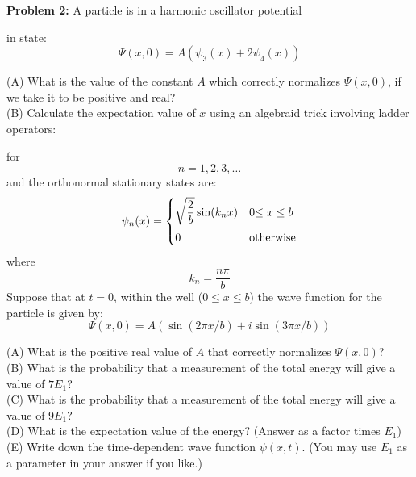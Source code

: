 \documentclass[12pt]{article}
\begin{document}
\noindent
{\bf Problem 2:}
A particle is in a harmonic oscillator potential




in state:
$$\Psi(x,0) = A\left( \psi_3(x) + 2\psi_4(x) \right)$$

(A) What is the value of the constant $A$ which correctly normalizes $\Psi(x,0)$, if we take it to be positive and real?\\[5pt]

(B) Calculate the expectation value of $x$ using an algebraid trick involving ladder operators:













for
$$n=1,2,3,\dots$$
and the orthonormal stationary states are:
$$
\psi_n(x) = 
\begin{cases}    
   {\displaystyle \sqrt{\frac{2}{b}}\sin(k_n x)} & 0 {\displaystyle \leq x \leq b} \\[8pt]
   0 & {\rm otherwise} \\
\end{cases}   
$$
where
$$k_n =\frac{n\pi}{b}$$
Suppose that at $t=0$, within the well ($0 \leq x \leq b$) the wave function for the particle is given by:
$$\Psi(x,0) = A \left( \sin(2\pi x/b) + i\sin(3\pi x/b)\right)$$

\noindent
(A) What is the positive real value of $A$ that correctly normalizes $\Psi(x,0)$?\\[5pt]

\noindent
(B) What is the probability that a measurement of the total energy will give a value of $7E_1$?\\[5pt]

\noindent
(C) What is the probability that a measurement of the total energy will give a value of $9E_1$?\\[5pt]

\noindent
(D) What is the expectation value of the energy? (Answer as a factor times $E_1$)\\[5pt]

\noindent
(E) Write down the time-dependent wave function $\psi(x,t)$.  (You may use $E_1$ as a parameter in your answer if you like.)\\[5pt]

\newpage
\end{document}
